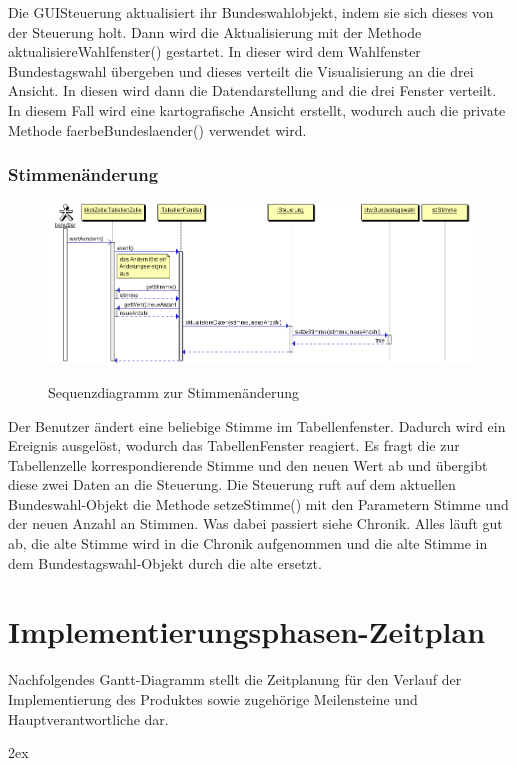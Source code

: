 \documentclass[12pt,a4paper,titlepage]{article}
\begin{document}
Die GUISteuerung aktualisiert ihr Bundeswahlobjekt, indem sie sich dieses von der Steuerung holt. Dann wird die Aktualisierung mit der Methode aktualisiereWahlfenster() gestartet. In dieser wird dem Wahlfenster Bundestagswahl übergeben und dieses verteilt die Visualisierung an die drei Ansicht. In diesen wird dann die Datendarstellung and die drei Fenster verteilt. In diesem Fall wird eine kartografische Ansicht erstellt, wodurch auch die private Methode faerbeBundeslaender() verwendet wird.

\newpage
\subsubsection{Stimmenänderung}
\begin{figure}
\centering
\includegraphics[scale=0.5]{GUI_Stimmenaenderung}\\ \caption{Sequenzdiagramm zur Stimmenänderung}
\end{figure}
Der Benutzer ändert eine beliebige Stimme im Tabellenfenster. Dadurch wird ein Ereignis ausgelöst, wodurch das
TabellenFenster reagiert. Es fragt die zur Tabellenzelle korrespondierende Stimme und den neuen Wert ab und übergibt
diese zwei Daten an die Steuerung. Die Steuerung ruft auf dem aktuellen Bundeswahl-Objekt die Methode setzeStimme()
mit den Parametern Stimme und der neuen Anzahl an Stimmen. Was dabei passiert siehe Chronik. Alles läuft gut ab, die alte Stimme wird in die Chronik aufgenommen und die alte Stimme in dem Bundestagswahl-Objekt durch die alte ersetzt.

\newpage

\section{Implementierungsphasen-Zeitplan}
Nachfolgendes Gantt-Diagramm stellt die Zeitplanung für den Verlauf der Implementierung des Produktes sowie zugehörige Meilensteine und Hauptverantwortliche dar.


\begingroup
\parindent 0pt
\parskip 2ex
\def\enotesize{\normalsize}

\endgroup
\end{document}
